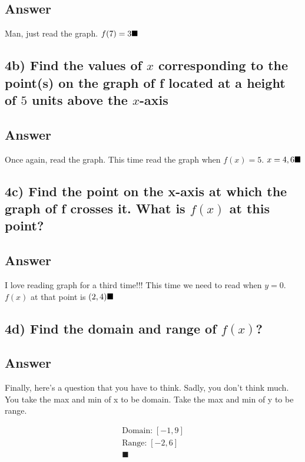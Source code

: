 \documentclass[17 pt]{extarticle}
\begin{document}
\subsection*{Answer}

Man, just read the graph. $f(7)=3 \\ \blacksquare$
\vspace{10mm}
\subsection*{4b) Find the values of $x$ corresponding to the point(s) on the
graph of f located at a height of $5$ units above the $x$-axis}
\vspace{5mm}
\subsection*{Answer}

Once again, read the graph. This time read the graph when $f(x)=5$. $x = 4,6 \\ \blacksquare$
\vspace{5mm}

\subsection*{4c) Find the point on the x-axis at which the graph of f crosses it. What is $f(x)$ at this point?}
\vspace{5mm}
\subsection*{Answer}

I love reading graph for a third time!!! This time we need to read when $y=0$. $f(x)$ at that point is $(2,4) \\ \blacksquare$

\vspace{10mm}

\subsection*{4d) Find the domain and range of $f(x)$?}
\vspace{5mm}
\subsection*{Answer}

Finally, here's a question that you have to think. Sadly, you don't think much. You take the max and min of x to be domain. Take the max and min
of y to be range. 

\begin{equation*}
    \begin{split}
        \text{Domain:} \; [-1,9] \\
        \text{Range:} \; [-2,6] \\ \blacksquare 
    \end{split}
    \end{equation*}
\enddocument{}
\end{document}
